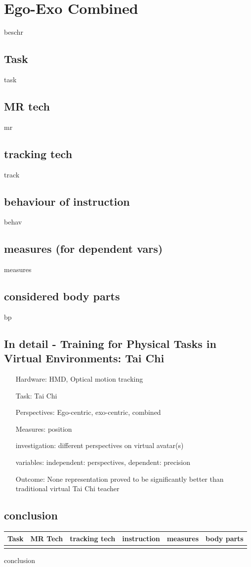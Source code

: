 \section{Ego-Exo Combined}
beschr
\subsection{Task}
task
\subsection{MR tech}
mr
\subsection{tracking tech}
track
\subsection{behaviour of instruction}
behav
\subsection{measures (for dependent vars)}
measures
\subsection{considered body parts}
bp
\subsection{In detail - Training for Physical Tasks in Virtual Environments: Tai Chi}
\begin{itemize}
	\item[Hardware:] HMD, Optical motion tracking
	\item[Task:] Tai Chi
	\item[Perspectives:] Ego-centric, exo-centric, combined
	\item[Measures:] position
	\item[investigation:] different perspectives on virtual avatar(s)
	\item[variables:] independent: perspectives, dependent: precision
	\item[Outcome:] None representation proved to be significantly better than traditional virtual Tai Chi teacher 
\end{itemize}
\subsection{conclusion}
\begin{table}[]
	\begin{tabular}{|l|l|l|l|l|l|}
		\hline
		Task & MR Tech & tracking tech & instruction & measures & body parts  \\ \hline
		&  &  &  &  &  \\ \hline
	\end{tabular}
\end{table}
conclusion

